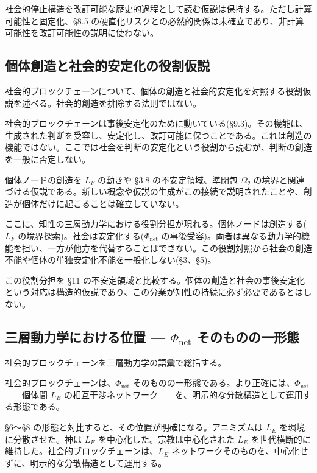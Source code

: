 社会的停止構造を改訂可能な歴史的過程として読む仮説は保持する。ただし計算可能性と固定化、\S{}8.5 の硬直化リスクとの必然的関係は未確立であり、非計算可能性を改訂可能性の説明に使わない。

\bigskip


\subsection{個体創造と社会的安定化の役割仮説}


社会的ブロックチェーンについて、個体の創造と社会的安定化を対照する役割仮説を述べる。社会的創造を排除する法則ではない。

社会的ブロックチェーンは事後安定化のために動いている(\S{}9.3)。その機能は、生成された判断を受容し、安定化し、改訂可能に保つことである。これは創造の機能ではない。ここでは社会を判断の安定化という役割から読むが、判断の創造を一般に否定しない。

個体ノードの創造を $L_F$ の動きや \S{}3.8 の不安定領域、準閉包 $\Omega_\theta$ の境界と関連づける仮説である。新しい概念や仮説の生成がこの接続で説明されたことや、創造が個体だけに起こることは確立していない。

ここに、知性の三層動力学における役割分担が現れる。個体ノードは創造する($L_F$ の境界探索)。社会は安定化する($\Phi_{\text{net}}$ の事後受容)。両者は異なる動力学的機能を担い、一方が他方を代替することはできない。この役割対照から社会の創造不能や個体の単独安定化不能を一般化しない(\S{}3、\S{}5)。

この役割分担を \S{}11 の不安定領域と比較する。個体の創造と社会の事後安定化という対応は構造的仮説であり、この分業が知性の持続に必ず必要であるとはしない。

\bigskip


\subsection{三層動力学における位置 — $\Phi_{\text{net}}$ そのものの一形態}


社会的ブロックチェーンを三層動力学の語彙で総括する。

社会的ブロックチェーンは、$\Phi_{\text{net}}$ そのものの一形態である。より正確には、$\Phi_{\text{net}}$——個体間 $L_E$ の相互干渉ネットワーク——を、明示的な分散構造として運用する形態である。

\S{}6〜\S{}8 の形態と対比すると、その位置が明確になる。アニミズムは $L_E$ を環境に分散させた。神は $L_E$ を中心化した。宗教は中心化された $L_E$ を世代横断的に維持した。社会的ブロックチェーンは、$L_E$ ネットワークそのものを、中心化せずに、明示的な分散構造として運用する。

